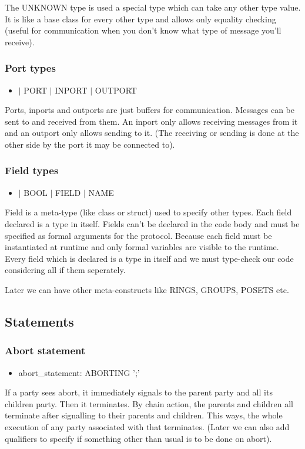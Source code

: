 The UNKNOWN type is used a special type which can take any other type value. It is like a base class for every other type and allows only equality checking (useful for communication when you don't know what type of message you'll receive).

\subsubsection{Port types}
\begin{itemize}
\item $|$ PORT $|$ INPORT $|$ OUTPORT
\end{itemize}
Ports, inports and outports are just buffers for communication. Messages can be sent to and received from them. An inport only allows receiving messages from it and an outport only allows sending to it. (The receiving or sending is done at the other side by the port it may be connected to).

\subsubsection{Field types}
\begin{itemize}
\item $|$ BOOL $|$ FIELD $|$ NAME
\end{itemize}
Field is a meta-type (like class or struct) used to specify other types. Each field declared is a type in itself. Fields can't be declared in the code body and must be specified as formal arguments for the protocol. Because each field must be instantiated at runtime and only formal variables are visible to the runtime. Every field which is declared is a type in itself and we must type-check our code considering all if them seperately.

Later we can have other meta-constructs like RINGS, GROUPS, POSETS etc.

\subsection{Statements}

\subsubsection{Abort statement}
\begin{itemize}
\item abort\_statement: ABORTING ';'
\end{itemize}

If a party sees abort, it immediately signals to the parent party and all its children party. Then it terminates. By chain action, the parents and children all terminate after signalling to their parents and children. This ways, the whole execution of any party associated with that terminates. (Later we can also add qualifiers to specify if something other than usual is to be done on abort).

